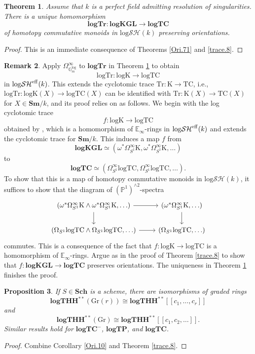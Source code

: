 \documentclass[11pt, a4paper]{amsart}
\newtheorem{thm}{Theorem}[subsection]
\newtheorem{prop}[thm]{Proposition}
\theoremstyle{definition}
\newtheorem{rmk}[thm]{Remark}
\numberwithin{equation}{subsection}
\renewcommand{\P}{\mathbb{P}}
\newcommand{\E}{\mathbb{E}}
\newcommand{\Sch}{\mathbf{Sch}}
\newcommand{\Sm}{\mathbf{Sm}}
\newcommand{\Gr}{{\mathrm{Gr}}}
\newcommand{\TC}{\mathrm{TC}}
\newcommand{\Tr}{\mathrm{Tr}}
\newcommand{\Kth}{\mathrm{K}}
\newcommand{\logKGL}{\mathbf{logKGL}}
\newcommand{\spectlogTHH}{\mathbf{logTHH}}
\newcommand{\logTC}{\mathrm{logTC}}
\newcommand{\logTr}{\mathrm{logTr}}
\newcommand{\spectlogTr}{\mathbf{logTr}}
\newcommand{\spectlogTC}{\mathbf{logTC}}
\newcommand{\spectlogTP}{\mathbf{logTP}}
\newcommand{\Kthlog}{\mathrm{logK}}
\newcommand{\Gmm}{\mathbb{G}_m^{\mathrm{log}}}
\newcommand{\eff}{{\rm eff}}
\newcommand{\inflogSH}{\mathrm{log}\mathcal{SH}}
\begin{document}
\begin{thm}
\label{trace.4}
Assume that $k$ is a perfect field admitting resolution of singularities.
There is a unique homomorphism\index[notation]{logTrspect @ $\spectlogTr$}
\[
\spectlogTr\colon \logKGL \to \spectlogTC
\]
of homotopy commutative monoids in $\inflogSH(k)$ preserving orientations.
\end{thm}
\begin{proof}
This is an immediate consequence of Theorems \ref{Ori.71} and \ref{trace.8}.
\end{proof}

\begin{rmk}
\label{trace.12}
Apply $\Omega_{\Gmm}^\infty$ to $\spectlogTr$ in Theorem \ref{trace.4} to obtain
\[
\logTr
\colon
\Kthlog \to \logTC
\]
in $\inflogSH^\eff(k)$.
This extends the cyclotomic trace $\Tr\colon \Kth\to \TC$,
i.e., $\logTr\colon \Kthlog(X)\to \logTC(X)$ can be identified with $\Tr\colon \Kth(X)\to \TC(X)$ for $X\in \Sm/k$,
and its proof relies on \cite{logSHF1} as follows.
We begin with the log cyclotomic trace
\[
f\colon 
\Kthlog
\to
\logTC
\]
obtained by \cite[Theorem F]{logSHF1},
which is a homomorphism of $\E_\infty$-rings in $\inflogSH^\eff(k)$ and extends the cyclotomic trace for $\Sm/k$.
This induces a map $f$ from
\[
\logKGL\simeq (\omega^*\Omega_{S^1}^\infty \Kth,\omega^*\Omega_{S^1}^\infty \Kth,\ldots)
\]
to
\[
\spectlogTC\simeq (\Omega_{S^1}^\infty \logTC,\Omega_{S^1}^\infty \logTC,\ldots).
\]
To show that this is a map of homotopy commutative monoids in $\inflogSH(k)$,
it suffices to show that the diagram of $(\P^1)^{\wedge 2}$-spectra
\[
\begin{tikzcd}
(\omega^*\Omega_{S^1}^\infty \Kth\wedge \omega^*\Omega_{S^1}^\infty \Kth,\ldots)\ar[d]\ar[r]&
(\omega^*\Omega_{S^1}^\infty \Kth,\ldots)\ar[d]
\\
(\Omega_{S^1}\logTC\wedge \Omega_{S^1}\logTC,\ldots)\ar[r]&
(\Omega_{S^1}\logTC,\ldots)
\end{tikzcd}
\]
commutes.
This is a consequence of the fact that $f\colon \Kthlog\to \logTC$ is a homomorphism of $\E_\infty$-rings.
Argue as in the proof of Theorem \ref{trace.8} to show that $f\colon \logKGL \to \spectlogTC$ preserves orientations.
The uniqueness in Theorem \ref{trace.4} finishes the proof.
\end{rmk}

\begin{prop}
\label{trace.9}
If $S\in \Sch$ is a scheme, 
there are isomorphisms of graded rings
\[
\spectlogTHH^{**}(\Gr(r))
\cong
\spectlogTHH^{**}[[c_1,\ldots,c_r]]
\]
and
\[
\spectlogTHH^{**}(\Gr)
\cong
\spectlogTHH^{**}[[c_1,c_2,\ldots]].
\]
Similar results hold for $\spectlogTC^{-}$, $\spectlogTP$, and $\spectlogTC$.
\end{prop}
\begin{proof}
Combine Corollary \ref{Ori.10} and Theorem \ref{trace.8}.
\end{proof}
\end{document}
